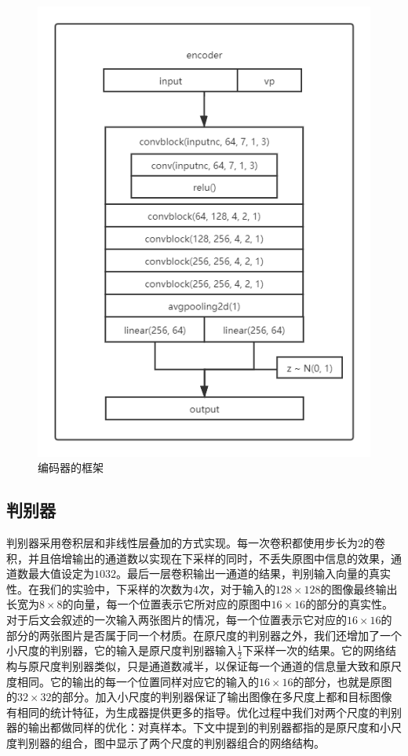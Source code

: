 \documentclass[UTF8,openany,AutoFakeBold,AutoFakeSlant,cs4size]{ctexbook}
\begin{document}
\begin{figure}[h]
\centering
\includegraphics[width=12cm]{./images/encoder.png}
\caption{编码器的框架}
\label{fig:sample}
\end{figure}

\subsection{判别器}

判别器采用卷积层和非线性层叠加的方式实现。每一次卷积都使用步长为$2$的卷积，并且倍增输出的通道数以实现在下采样的同时，不丢失原图中信息的效果，通道数最大值设定为$1032$。最后一层卷积输出一通道的结果，判别输入向量的真实性。在我们的实验中，下采样的次数为$4$次，对于输入的$128 \times 128$的图像最终输出长宽为$8\times8$的向量，每一个位置表示它所对应的原图中$16\times16$的部分的真实性。对于后文会叙述的一次输入两张图片的情况，每一个位置表示它对应的$16\times16$的部分的两张图片是否属于同一个材质。在原尺度的判别器之外，我们还增加了一个小尺度的判别器，它的输入是原尺度判别器输入$\frac{1}{2}$下采样一次的结果。它的网络结构与原尺度判别器类似，只是通道数减半，以保证每一个通道的信息量大致和原尺度相同。它的输出的每一个位置同样对应它的输入的$16\times16$的部分，也就是原图的$32\times32$的部分。加入小尺度的判别器保证了输出图像在多尺度上都和目标图像有相同的统计特征，为生成器提供更多的指导。优化过程中我们对两个尺度的判别器的输出都做同样的优化：对真样本。下文中提到的判别器都指的是原尺度和小尺度判别器的组合，图中显示了两个尺度的判别器组合的网络结构。
\end{document}
